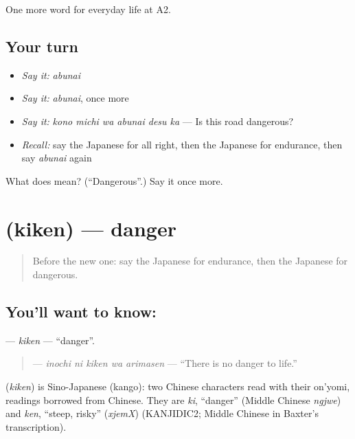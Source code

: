 \begin{grammarlens}[title={What you've built}]
One more word for everyday life at A2.
\end{grammarlens}

\subsection*{Your turn}
\begin{itemize}
\raggedright
  \item \emph{Say it:} \emph{abunai}
  \item \emph{Say it:} \emph{abunai}, once more
  \item \emph{Say it:} \emph{kono michi wa abunai desu ka} — Is this road dangerous?
  \item \emph{Recall:} say the Japanese for all right, then the Japanese for endurance, then say \emph{abunai} again
\end{itemize}

\begin{tcolorbox}[breakable,colback=teal!4,colframe=teal!35!black,title={Before you move on}]
What does  mean? (\textquotedblleft{}Dangerous\textquotedblright{}.) Say it once more.
\end{tcolorbox}
\section[\texorpdfstring{\ja{きけん} (kiken)}{きけん (kiken)}]{ (kiken) — danger}

\label{lesson:JA-C223-kiken}



\begin{quote}
Before the new one: say the Japanese for endurance, then the Japanese for dangerous.
\end{quote}

\subsection*{You'll want to know: }
\textbf{} — \emph{kiken} — \textquotedblleft{}danger\textquotedblright{}.

\begin{quote}
\textbf{  } — \emph{inochi ni kiken wa arimasen} — \textquotedblleft{}There is no danger to life.\textquotedblright{}
\end{quote}

\begin{cousinweb}
\textbf{} (\emph{kiken}) is Sino-Japanese (kango): two Chinese characters read with their on'yomi, readings borrowed from Chinese. They are \emph{ki}, \textquotedblleft{}danger\textquotedblright{} (Middle Chinese \emph{ngjwe}) and \emph{ken}, \textquotedblleft{}steep, risky\textquotedblright{} (\emph{xjemX}) (KANJIDIC2; Middle Chinese in Baxter's transcription).
\end{cousinweb}

